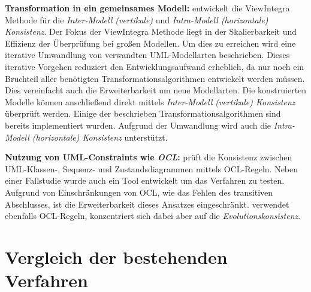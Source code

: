 \textbf{Transformation in ein gemeinsames Modell:}
\cite{Egyed2001} entwickelt die ViewIntegra Methode für die  \emph{Inter-Modell (vertikale)} und \emph{Intra-Modell (horizontale) Konsistenz}.
Der Fokus der ViewIntegra Methode liegt in der Skalierbarkeit und Effizienz der Überprüfung bei großen Modellen.
Um dies zu erreichen wird eine iterative Umwandlung von verwandten UML-Modellarten beschrieben.
Dieses iterative Vorgehen reduziert den Entwicklungsaufwand erheblich, da nur noch ein Bruchteil aller benötigten Transformationsalgorithmen entwickelt werden müssen.
Dies vereinfacht auch die Erweiterbarkeit um neue Modellarten.
Die konstruierten Modelle können anschließend direkt mittels \emph{Inter-Modell (vertikale) Konsistenz} überprüft werden.
Einige der beschrieben Transformationsalgorithmen sind bereits implementiert wurden.
Aufgrund der Umwandlung wird auch die \emph{Intra-Modell (horizontale) Konsistenz} unterstützt.

\textbf{Nutzung von UML-Constraints wie \emph{OCL}:}
\cite{Egyed2006} prüft die Konsistenz zwischen UML-Klassen-, Sequenz- und Zustandsdiagrammen mittels OCL-Regeln.
Neben einer Fallstudie wurde auch ein Tool entwickelt um das Verfahren zu testen.
Aufgrund von Einschränkungen von OCL, wie das Fehlen des transitiven Abschlusses, ist die Erweiterbarkeit dieses Ansatzes eingeschränkt.
\cite{Briand2003} verwendet ebenfalls OCL-Regeln, konzentriert sich dabei aber auf die \emph{Evolutionskonsistenz}.

\section{Vergleich der bestehenden Verfahren}


